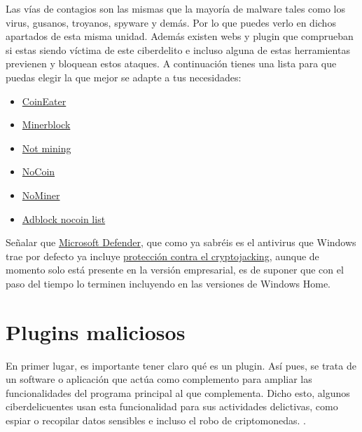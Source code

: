 \documentclass[
  spanish,
  a4paper,
  openany]{book}
\begin{document}
Las vías de contagios son las mismas que la mayoría de malware tales como los virus, gusanos, troyanos, spyware y demás. Por lo que puedes verlo en dichos apartados de esta misma unidad. Además existen webs y plugin que comprueban si estas siendo víctima de este ciberdelito e incluso alguna de estas herramientas previenen y bloquean estos ataques. A continuación tienes una lista para que puedas elegir la que mejor se adapte a tus necesidades:

\begin{itemize}
\item
  \href{https://github.com/fhstp/CoinEater}{CoinEater}
\item
  \href{https://github.com/xd4rker/MinerBlock}{Minerblock}
\item
  \href{https://notmining.es}{Not mining}
\item
  \href{https://github.com/keraf/NoCoin}{NoCoin}
\item
  \href{https://chrome.google.com/webstore/detail/nominer-block-coin-miners/jfnangjojcioomickmmnfmiadkfhcdmd}{NoMiner}
\item
  \href{https://github.com/hoshsadiq/adblock-nocoin-list}{Adblock nocoin list}
\end{itemize}

Señalar que \href{https://www.microsoft.com/es-es/windows/comprehensive-security}{Microsoft Defender}, que como ya sabréis es el antivirus que Windows trae por defecto ya incluye \href{https://www.microsoft.com/security/blog/2021/04/26/defending-against-cryptojacking-with-microsoft-defender-for-endpoint-and-intel-tdt/}{protección contra el cryptojacking}, aunque de momento solo está presente en la versión empresarial, es de suponer que con el paso del tiempo lo terminen incluyendo en las versiones de Windows Home.

\hypertarget{plugins-maliciosos}{%
\section{Plugins maliciosos}\label{plugins-maliciosos}}

En primer lugar, es importante tener claro qué es un plugin. Así pues, se trata de un software o aplicación que actúa como complemento para ampliar las funcionalidades del programa principal al que complementa. Dicho esto, algunos ciberdelicuentes usan esta funcionalidad para sus actividades delictivas, como espiar o recopilar datos sensibles e incluso el robo de criptomonedas. \citep{IONOS-plugin}.
\end{document}
